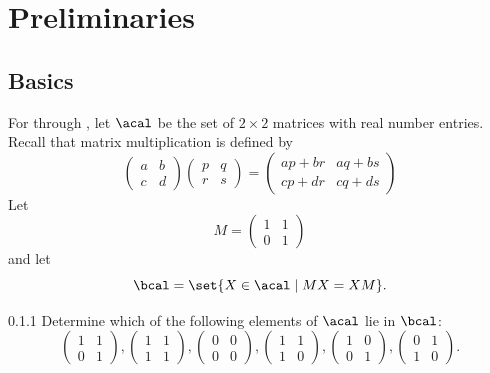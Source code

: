 \setcounter{section}{-1}
\section{Preliminaries}

\subsection{Basics}

For  through , let $\acal$ be the set of $2 \times 2$ matrices with real number entries.
Recall that matrix multiplication is defined by
\[
    \begin{pmatrix}
        a & b \\
        c & d
    \end{pmatrix}
    \begin{pmatrix}
        p & q \\
        r & s
    \end{pmatrix}
    = 
    \begin{pmatrix}
        ap + br & aq + bs \\
        cp + dr & cq + ds
    \end{pmatrix}
\]
Let
\[
    M = 
    \begin{pmatrix}
        1 & 1 \\
        0 & 1
    \end{pmatrix}
\]
and let
\[
    \bcal = \set{X \in \acal \mid MX = XM}.
\]

\begin{exercise}{0.1.1}
    Determine which of the following elements of $\acal$ lie in $\bcal$:
    \[
        \begin{pmatrix}
            1 & 1 \\
            0 & 1
        \end{pmatrix},
        \begin{pmatrix}
            1 & 1 \\
            1 & 1
        \end{pmatrix},
        \begin{pmatrix}
            0 & 0 \\
            0 & 0
        \end{pmatrix},
        \begin{pmatrix}
            1 & 1 \\
            1 & 0
        \end{pmatrix},
        \begin{pmatrix}
            1 & 0 \\
            0 & 1
        \end{pmatrix},
        \begin{pmatrix}
            0 & 1 \\
            1 & 0 
        \end{pmatrix}.
    \]
\end{exercise}

